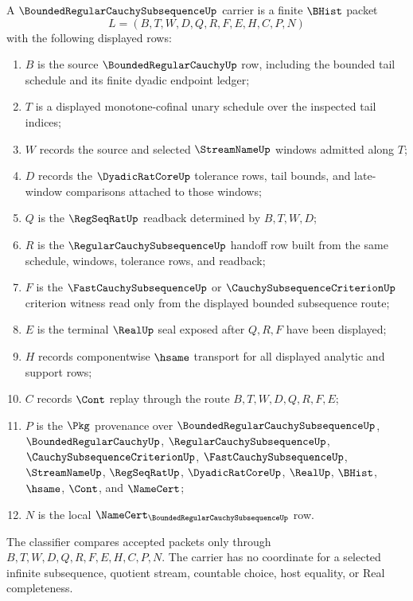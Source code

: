 \begin{definition}
\label{def:bounded-regular-cauchy-subsequence-carrier}
A $\BoundedRegularCauchySubsequenceUp$ carrier is a finite $\BHist$ packet
$$
L=(B,T,W,D,Q,R,F,E,H,C,P,N)
$$
with the following displayed rows:
\begin{enumerate}
\item $B$ is the source $\BoundedRegularCauchyUp$ row, including the bounded tail schedule and its finite dyadic endpoint ledger;
\item $T$ is a displayed monotone-cofinal unary schedule over the inspected tail indices;
\item $W$ records the source and selected $\StreamNameUp$ windows admitted along $T$;
\item $D$ records the $\DyadicRatCoreUp$ tolerance rows, tail bounds, and late-window comparisons attached to those windows;
\item $Q$ is the $\RegSeqRatUp$ readback determined by $B,T,W,D$;
\item $R$ is the $\RegularCauchySubsequenceUp$ handoff row built from the same schedule, windows, tolerance rows, and readback;
\item $F$ is the $\FastCauchySubsequenceUp$ or $\CauchySubsequenceCriterionUp$ criterion witness read only from the displayed bounded subsequence route;
\item $E$ is the terminal $\RealUp$ seal exposed after $Q,R,F$ have been displayed;
\item $H$ records componentwise $\hsame$ transport for all displayed analytic and support rows;
\item $C$ records $\Cont$ replay through the route $B,T,W,D,Q,R,F,E$;
\item $P$ is the $\Pkg$ provenance over $\BoundedRegularCauchySubsequenceUp$, $\BoundedRegularCauchyUp$, $\RegularCauchySubsequenceUp$, $\CauchySubsequenceCriterionUp$, $\FastCauchySubsequenceUp$, $\StreamNameUp$, $\RegSeqRatUp$, $\DyadicRatCoreUp$, $\RealUp$, $\BHist$, $\hsame$, $\Cont$, and $\NameCert$;
\item $N$ is the local $\NameCert_{\BoundedRegularCauchySubsequenceUp}$ row.
\end{enumerate}
The classifier compares accepted packets only through $B,T,W,D,Q,R,F,E,H,C,P,N$. The carrier has no coordinate for a selected infinite subsequence, quotient stream, countable choice, host equality, or Real completeness.
\end{definition}


